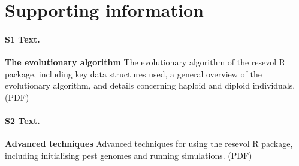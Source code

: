\documentclass[10pt,letterpaper]{article}
\begin{document}
\section*{Supporting information}

\paragraph*{S1 Text.}
\label{S1_Text}
{\bf The evolutionary algorithm} The evolutionary algorithm of the resevol R package, including key data structures used, a general overview of the evolutionary algorithm, and details concerning haploid and diploid individuals. (PDF)


\paragraph*{S2 Text.}
\label{S2_Text}
{\bf Advanced techniques}  Advanced techniques for using the resevol R package, including initialising pest genomes and running simulations. (PDF)
\end{document}
